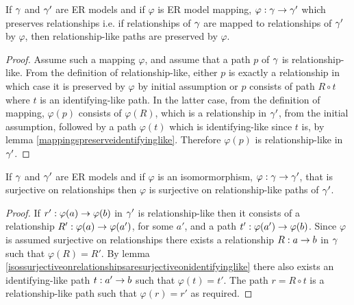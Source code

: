 \begin{lemma}
If $\gamma$ and $\gamma'$ are ER models and  if  $\varphi$ is ER model mapping, $\varphi: \gamma \rightarrow \gamma'$  which preserves relationships  i.e. if relationships of $\gamma$ are mapped to relationships of $\gamma'$ by  $\varphi$, then relationship-like paths are preserved by $\varphi$.
\end{lemma}
\begin{proof}
Assume such a mapping $\varphi$, and assume that a path $p$ of $\gamma$ is relationship-like.
From the definition of relationship-like, either $p$ is exactly a relationship in which case it is preserved by $\varphi$ by initial assumption or $p$ consists of path $R \circ t$ where $t$ is an identifying-like path.
In the latter case, from the definition of mapping, $\varphi(p)$ consists of $\varphi(R)$, which is a relationship in $\gamma'$, from the initial assumption, followed by a path $\varphi(t)$ which is identifying-like since $t$ is, by lemma \ref{mappingspreserveidentifyinglike}. Therefore $\varphi(p)$ is relationship-like in $\gamma'$.
\end{proof}

\begin{lemma}
If $\gamma$ and $\gamma'$ are ER models and  if  $\varphi$ is an isomormorphism, $\varphi: \gamma \rightarrow \gamma'$, that is surjective on relationships    
then $\varphi$ is surjective on relationship-like paths of $\gamma'$. 
\end{lemma}
\begin{proof}
If $r':\varphi(a) \rightarrow \varphi(b)$ in $\gamma'$ is relationship-like then it consists of a relationship $R': \varphi(a) \rightarrow \varphi(a')$, for some $a'$,
and a path $t':\varphi(a') \rightarrow \varphi(b)$. Since $\varphi$ is assumed surjective on relationships there exists a relationship 
$R:a \rightarrow b$ in $\gamma$ such that $\varphi(R)=R'$. 
By lemma \ref{isossurjectiveonrelationshipsaresurjectiveonidentifyinglike} there also exists an identifying-like path $t:a' \rightarrow b$ such that $\varphi(t)=t'$.
The path $r=R \circ t$ is a relationship-like path such that $\varphi(r)=r'$ as required.
\end{proof}

 

